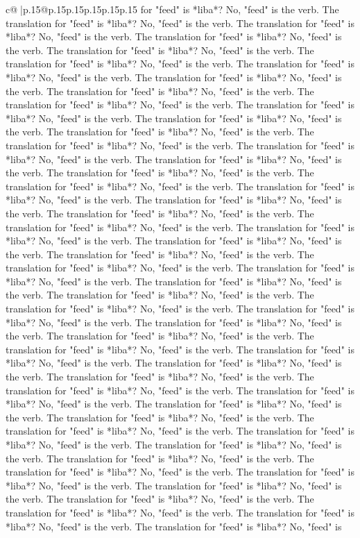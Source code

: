 \documentclass{article}
\begin{document}
{\begin{supertabular}{c@{$\;$}|p{.15\linewidth}@{}p{.15\linewidth}p{.15\linewidth}p{.15\linewidth}p{.15\linewidth}p{.15\linewidth}}
{{{for "feed" is *liba*? No, "feed" is the verb. The translation for "feed" is *liba*? No, "feed" is the verb. The translation for "feed" is *liba*? No, "feed" is the verb. The translation for "feed" is *liba*? No, "feed" is the verb. The translation for "feed" is *liba*? No, "feed" is the verb. The translation for "feed" is *liba*? No, "feed" is the verb. The translation for "feed" is *liba*? No, "feed" is the verb. The translation for "feed" is *liba*? No, "feed" is the verb. The translation for "feed" is *liba*? No, "feed" is the verb. The translation for "feed" is *liba*? No, "feed" is the verb. The translation for "feed" is *liba*? No, "feed" is the verb. The translation for "feed" is *liba*? No, "feed" is the verb. The translation for "feed" is *liba*? No, "feed" is the verb. The translation for "feed" is *liba*? No, "feed" is the verb. The translation for "feed" is *liba*? No, "feed" is the verb. The translation for "feed" is *liba*? No, "feed" is the verb. The translation for "feed" is *liba*? No, "feed" is the verb. The translation for "feed" is *liba*? No, "feed" is the verb. The translation for "feed" is *liba*? No, "feed" is the verb. The translation for "feed" is *liba*? No, "feed" is the verb. The translation for "feed" is *liba*? No, "feed" is the verb. The translation for "feed" is *liba*? No, "feed" is the verb. The translation for "feed" is *liba*? No, "feed" is the verb. The translation for "feed" is *liba*? No, "feed" is the verb. The translation for "feed" is *liba*? No, "feed" is the verb. The translation for "feed" is *liba*? No, "feed" is the verb. The translation for "feed" is *liba*? No, "feed" is the verb. The translation for "feed" is *liba*? No, "feed" is the verb. The translation for "feed" is *liba*? No, "feed" is the verb. The translation for "feed" is *liba*? No, "feed" is the verb. The translation for "feed" is *liba*? No, "feed" is the verb. The translation for "feed" is *liba*? No, "feed" is the verb. The translation for "feed" is *liba*? No, "feed" is the verb. The translation for "feed" is *liba*? No, "feed" is the verb. The translation for "feed" is *liba*? No, "feed" is the verb. The translation for "feed" is *liba*? No, "feed" is the verb. The translation for "feed" is *liba*? No, "feed" is the verb. The translation for "feed" is *liba*? No, "feed" is the verb. The translation for "feed" is *liba*? No, "feed" is the verb. The translation for "feed" is *liba*? No, "feed" is the verb. The translation for "feed" is *liba*? No, "feed" is the verb. The translation for "feed" is *liba*? No, "feed" is the verb. The translation for "feed" is *liba*? No, "feed" is the verb. The translation for "feed" is *liba*? No, "feed" is the verb. The translation for "feed" is *liba*? No, "feed" is the verb. The translation for "feed" is *liba*? No, "feed" is the verb. The translation for "feed" is *liba*? No, "feed" is the verb. The translation for "feed" is *liba*? No, "feed" is the verb. The translation for "feed" is *liba*? No, "feed" is the verb. The translation for "feed" is *liba*? No, "feed" is the verb. The translation for "feed" is *liba*? No, "feed" is the verb. The translation for "feed" is *liba*? No, "feed" is }}}
\end{supertabular}}
\end{document}
